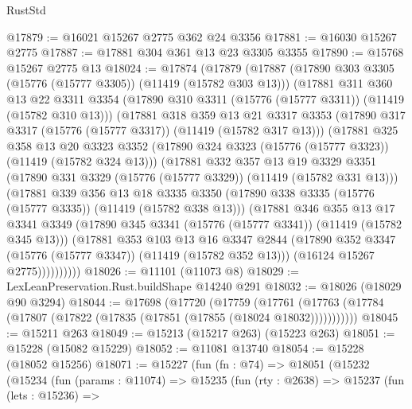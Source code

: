 \begin{lexlean}{RustStd}
\begin{coremodule}
@17879 := @16021 @15267 @2775 @362 @24 @3356
@17881 := @16030 @15267 @2775
@17887 := @17881 @304 @361 @13 @23 @3305 @3355
@17890 := @15768 @15267 @2775 @13
@18024 := @17874
    (@17879
      (@17887
        (@17890 @303 @3305 (@15776 (@15777 @3305)) (@11419 (@15782 @303 @13)))
        (@17881
          @311
          @360
          @13
          @22
          @3311
          @3354
          (@17890 @310 @3311 (@15776 (@15777 @3311)) (@11419 (@15782 @310 @13)))
          (@17881
            @318
            @359
            @13
            @21
            @3317
            @3353
            (@17890 @317 @3317 (@15776 (@15777 @3317)) (@11419 (@15782 @317 @13)))
            (@17881
              @325
              @358
              @13
              @20
              @3323
              @3352
              (@17890 @324 @3323 (@15776 (@15777 @3323)) (@11419 (@15782 @324 @13)))
              (@17881
                @332
                @357
                @13
                @19
                @3329
                @3351
                (@17890 @331 @3329 (@15776 (@15777 @3329)) (@11419 (@15782 @331 @13)))
                (@17881
                  @339
                  @356
                  @13
                  @18
                  @3335
                  @3350
                  (@17890 @338 @3335 (@15776 (@15777 @3335)) (@11419 (@15782 @338 @13)))
                  (@17881
                    @346
                    @355
                    @13
                    @17
                    @3341
                    @3349
                    (@17890 @345 @3341 (@15776 (@15777 @3341)) (@11419 (@15782 @345 @13)))
                    (@17881
                      @353
                      @103
                      @13
                      @16
                      @3347
                      @2844
                      (@17890 @352 @3347 (@15776 (@15777 @3347)) (@11419 (@15782 @352 @13)))
                      (@16124 @15267 @2775))))))))))
@18026 := @11101 (@11073 @8)
@18029 := LexLeanPreservation.Rust.buildShape @14240 @291
@18032 := @18026 (@18029 @90 @3294)
@18044 := @17698
    (@17720
      (@17759
        (@17761 (@17763 (@17784 (@17807 (@17822 (@17835 (@17851 (@17855 (@18024 @18032)))))))))))
@18045 := @15211 @263
@18049 := @15213 (@15217 @263) (@15223 @263)
@18051 := @15228 (@15082 @15229)
@18052 := @11081 @13740
@18054 := @15228 (@18052 @15256)
@18071 := @15227
    (fun (fn : @74) =>
    @18051
      (@15232
        (@15234
          (fun (params : @11074) =>
          @15235
            (fun (rty : @2638) =>
            @15237
              (fun (lets : @15236) =>

\end{coremodule}
\end{lexlean}
